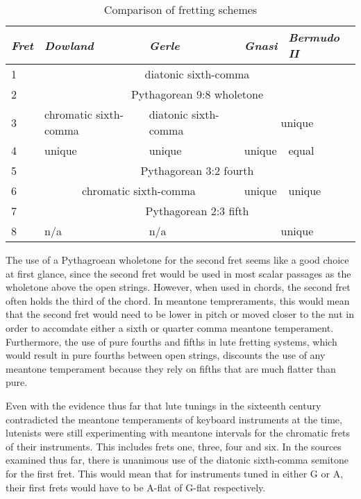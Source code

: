 \begin{table}[h!]
  \begin{center}
    \begin{tabular}{ l l l l l }
      \textit{Fret} & \textit{Dowland} & \textit{Gerle} & \textit{Gnasi} & \textit{Bermudo II} \\
      \hline
      1 & \multicolumn{4}{|c|}{\cellcolor[gray]{0.9}diatonic sixth-comma} \\
      2 & \multicolumn{4}{|c|}{\cellcolor[gray]{0.9}Pythagorean 9:8 wholetone} \\
      3 & chromatic sixth-comma & diatonic sixth-comma & \multicolumn{2}{|c|}{\cellcolor[gray]{0.9}unique} \\
      4 & unique & unique & unique & equal \\
      5 & \multicolumn{4}{|c|}{\cellcolor[gray]{0.9}Pythagorean 3:2 fourth} \\
      6 & \multicolumn{2}{|c|}{\cellcolor[gray]{0.9}chromatic sixth-comma} & unique & unique \\
      7 & \multicolumn{4}{|c|}{\cellcolor[gray]{0.9}Pythagorean 2:3 fifth} \\
      8 & n/a & n/a & \multicolumn{2}{|c|}{\cellcolor[gray]{0.9}unique} \\
    \end{tabular}
  \end{center}
  \caption{Comparison of fretting schemes}
  \label{table:comparison}
\end{table}

The use of a Pythagroean wholetone for the second fret seems like a good choice at first glance,
since the second fret would be used in most scalar passages as the wholetone above the open
strings.  However, when used in chords, the second fret often holds the third of the chord.
In meantone tempreraments, this would mean that the second fret would need to be lower in
pitch or moved closer to the nut in order to accomdate either a sixth or quarter comma meantone
temperament.  Furthermore, the use of pure fourths and fifths in  lute fretting systems,
which would result in pure fourths between open strings, discounts the use of any meantone
temperament because they rely on fifths that are much flatter than pure.

Even with the evidence thus far that lute tunings in the sixteenth century contradicted the meantone
temperaments of keyboard instruments at the time, lutenists were still
experimenting with meantone intervals for the chromatic frets of their instruments.  This
includes frets one, three, four and six.  In the sources examined thus far, there is unanimous
use of the diatonic sixth-comma semitone for the first fret.  This would mean that for instruments
tuned in either G or A, their first frets would have to be A-flat of G-flat respectively.

